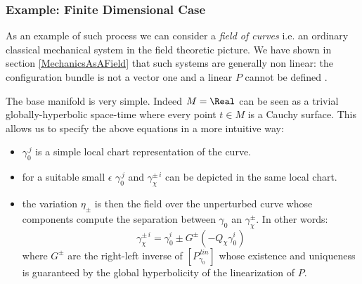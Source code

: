 \documentclass[Main]{subfiles}
\begin{document}
	\subsubsection{Example: Finite Dimensional Case} 
		As an example of such process we can consider a \emph{field of curves} i.e. an ordinary classical mechanical system in the field theoretic picture.
		We have shown in section \ref{MechanicsAsAField} that such systems are generally non linear: the configuration bundle is not a vector one and %
		a linear $P$ cannot be defined .
			
		The base manifold is very simple. Indeed $M= \Real$ can be seen as a trivial globally-hyperbolic space-time where every point $t\in M$ is a Cauchy surface.
		This allows us to specify the above equations in a more intuitive way:
		\begin{itemize}
			\item $\gamma_0^{\, j}$ is a simple local chart representation of the curve.
			\item for a suitable small $\epsilon$  $\gamma_0^{\, j}$ and $\gamma_{\chi}^{\pm\,i} $ can be depicted in the same local chart.
			\item the variation $\eta_\pm$ is then the field over the unperturbed curve whose components compute the separation between $\gamma_0$ an $\gamma_{\chi}^{\pm} $. In other words:
			\begin{displaymath}
				\gamma_{\chi}^{\pm \, i} = \gamma_0^i  \pm G^\pm (-Q_\chi \gamma_0^i)
			\end{displaymath}
			where $G^\pm$ are the right-left inverse of $\left[P_{\gamma_0}^{\, lin} \right]$ whose existence and uniqueness is guaranteed by the global hyperbolicity of the linearization of $P$.
		\end{itemize}
		
			\begin{minipage}{\linewidth}%
			
			\label{GraphicAdvRetSol}%
			
			\end{minipage}
		
\end{document}

